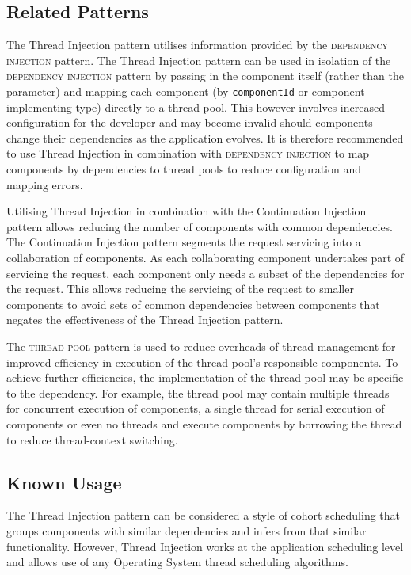 \documentclass[prodmode]{style/acmlarge}
\begin{document}
\subsection{Related Patterns}

The Thread Injection pattern utilises information provided by the
\textsc{dependency injection} pattern.  The Thread Injection pattern can be used
in isolation of the \textsc{dependency injection} pattern by passing in the
component itself (rather than the parameter) and mapping each component (by
\texttt{componentId} or component implementing type) directly to a thread pool. 
This however involves increased configuration for the developer and may become
invalid should components change their dependencies as the application evolves. 
It is therefore recommended to use Thread Injection in combination with
\textsc{dependency injection} to map components by dependencies to thread pools
to reduce configuration and mapping errors.

Utilising Thread Injection in combination with the Continuation Injection
pattern allows reducing the number of components with common dependencies.  The
Continuation Injection pattern segments the request servicing into a
collaboration of components.  As each collaborating component undertakes part of
servicing the request, each component only needs a subset of the dependencies
for the request.  This allows reducing the servicing of the request to smaller
components to avoid sets of common dependencies between components that negates
the effectiveness of the Thread Injection pattern.

The \textsc{thread pool} pattern \cite{thread-per-request} is used to reduce
overheads of thread management for improved efficiency in execution of the
thread pool's responsible components.  To achieve further efficiencies, the
implementation of the thread pool may be specific to the dependency.  For
example, the thread pool may contain multiple threads for concurrent execution
of components, a single thread for serial execution of components or even no
threads and execute components by borrowing the thread to reduce thread-context
switching.


\subsection{Known Usage}

The Thread Injection pattern can be considered a style of cohort scheduling
\cite{cohort} that groups components with similar dependencies and infers from
that similar functionality.  However, Thread Injection works at the application
scheduling level and allows use of any Operating System thread scheduling
algorithms.
\end{document}
